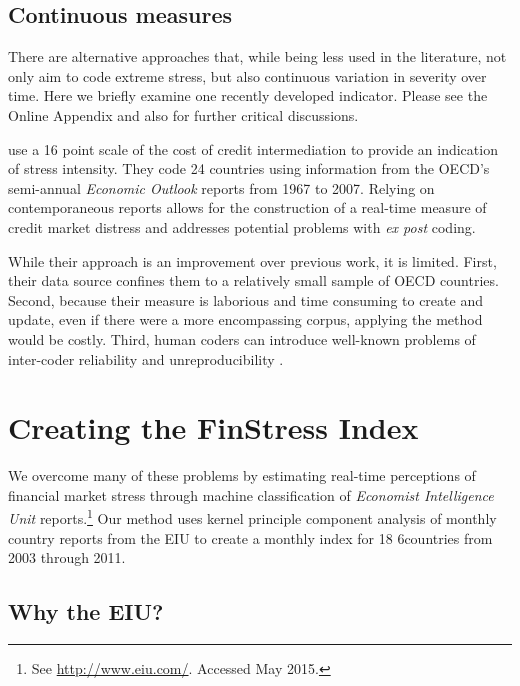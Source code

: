 \documentclass[]{article}
\begin{document}
\subsection{Continuous measures}

There are alternative approaches that, while being less used in the literature, not only aim to code extreme stress, but also continuous variation in severity over time. Here we briefly examine one recently developed indicator. Please see the Online Appendix and also \cite{Kliesen2012} for further critical discussions.

\cite{Romer2015} use a 16 point scale of the cost of credit intermediation to provide an indication of stress intensity. They code 24 countries using information from the OECD's semi-annual \emph{Economic Outlook} reports from 1967 to 2007. Relying on contemporaneous reports allows for the construction of a real-time measure of credit market distress and addresses potential problems with \emph{ex post} coding.

While their approach is an improvement over previous work, it is limited. First, their data source confines them to a relatively small sample of OECD countries. Second, because their measure is laborious and time consuming to create and update, even if there were a more encompassing corpus, applying the method would be costly. Third, human coders can introduce well-known problems of inter-coder reliability and unreproducibility \citep{Minhas2015}.

\section{Creating the FinStress Index}

We overcome many of these problems by estimating real-time perceptions of financial market stress through machine classification of \emph{Economist Intelligence Unit} reports.\footnote{See \url{http://www.eiu.com/}. Accessed May 2015.} Our method uses kernel principle component analysis \citep{Scholkopf1998,lodhi2002,Spirling2012} of monthly country reports from the EIU to create a monthly index for 18 6countries from 2003 through 2011.

\subsection{Why the EIU?}\label{why-the-eiu}
\end{document}
